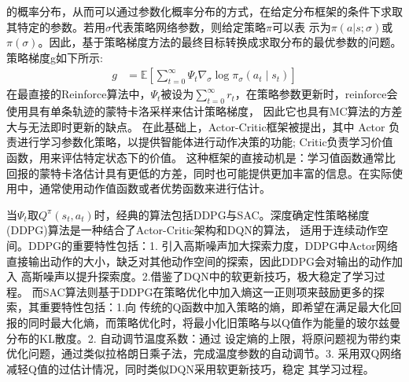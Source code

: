 \begin{itemize}
    的概率分布，从而可以通过参数化概率分布的方式，在给定分布框架的条件下求取其特定的参数。若用$\sigma$代表策略网络参数，则给定策略$\pi$可以表
    示为$\pi(a|s;\sigma)$或$\pi(\sigma)$。因此，基于策略梯度方法的最终目标转换成求取分布的最优参数的问题。策略梯度g如下所示:
    \begin{align}
        g & = \mathbb{E}\left[\sum_{t = 0}^{\infty} \Psi_{t} \nabla_{\sigma} \log \pi_{\sigma}\left(a_{t} \mid s_{t}\right)\right]
    \end{align}
    在最直接的Reinforce算法中，$\Psi_{t}$被设为$\sum_{t=0}^{\infty} r_{t}$，在策略参数更新时，reinforce会使用具有单条轨迹的蒙特卡洛采样来估计策略梯度，
    因此它也具有MC算法的方差大与无法即时更新的缺点。
    在此基础上，Actor-Critic框架被提出，其中 Actor 负责进行学习参数化策略，以提供智能体进行动作决策的功能; Critic负责学习价值函数，用来评估特定状态下的价值。
    这种框架的直接动机是：学习值函数通常比回报的蒙特卡洛估计具有更低的方差，同时也可能提供更加丰富的信息。在实际使用中，通常使用动作值函数或者优势函数来进行估计。
    
    当$\Psi_{t}$取$Q^{\pi}\left(s_{t}, a_{t}\right)$时，经典的算法包括DDPG与SAC。深度确定性策略梯度(DDPG)算法是一种结合了Actor-Critic架构和DQN的算法，
    适用于连续动作空间。DDPG的重要特性包括：1. 引入高斯噪声加大探索力度，DDPG中Actor网络直接输出动作的大小，缺乏对其他动作空间的探索，因此DDPG会对输出的动作加入
    高斯噪声以提升探索度。2.借鉴了DQN中的软更新技巧，极大稳定了学习过程。 而SAC算法则基于DDPG在策略优化中加入熵这一正则项来鼓励更多的探索，其重要特性包括：1.向
    传统的Q函数中加入策略的熵，即希望在满足最大化回报的同时最大化熵，而策略优化时，将最小化旧策略与以Q值作为能量的玻尔兹曼分布的KL散度。2. 自动调节温度系数：通过
    设定熵的上限，将原问题视为带约束优化问题，通过类似拉格朗日乘子法，完成温度参数的自动调节。3. 采用双Q网络减轻Q值的过估计情况，同时类似DQN采用软更新技巧，稳定
    其学习过程。


\end{itemize}
